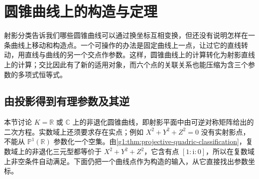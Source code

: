 
% 
% 

\section{圆锥曲线上的构造与定理}
\label{g1:sec:0205}

射影分类告诉我们哪些圆锥曲线可以通过换坐标互相变换，但还没有说明怎样在一条曲线上移动和构造点。一个可操作的办法是固定曲线上一点，让过它的直线转动，用直线与曲线的另一个交点作参数。这样，圆锥曲线上的计算转化为射影直线上的计算；交比因此有了新的适用对象，而六个点的关联关系也能压缩为含三个参数的多项式恒等式。

\subsection{由投影得到有理参数及其逆}
\label{g1:subsec:0205:01}

本节讨论 \(K=\mathbb R\) 或 \(\mathbb C\) 上的非退化圆锥曲线，即射影平面中由可逆对称矩阵给出的二次方程。实数域上还须要求存在实点；例如 \(X^2+Y^2+Z^2=0\) 没有实射影点，不能从 \(\mathbb P^1(\mathbb R)\) 参数化一个空集。由\cref{g1:thm:projective-quadric-classification}，复数域上的非退化三元型都等价于 \(X^2+Y^2+Z^2\)，它含有点 \([1:\mathrm i:0]\)，所以在复数域上非空条件自动满足。下面仍把一个曲线点作为构造的输入，从它直接找出参数坐标。

